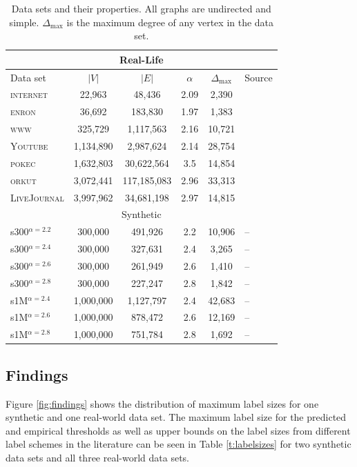 \begin{table}[!ht]
\centering
\small
\begin{tabular}{lccccl}\hline
\multicolumn{6}{c}{Real-Life}\\\hline
Data set  & $\vert V \vert$ & $\vert E\vert$ & $\alpha$  & $\Delta_{\max}$ & Source\\\hline
\textsc{internet} &  22,963        &    48,436      & 2.09     & 2,390        & \cite{newman}\\
\textsc{enron}    &  36,692        &   183,830      & 1.97    &1,383         & \cite{leskovec2009community}\\
\textsc{www}      & 325,729        & 1,117,563     & 2.16 & 10,721            & \cite{albert1999internet}\\
\textsc{Youtube} & 1,134,890 & 2,987,624 & 2.14 & 28,754 & \cite{?}\\
\textsc{pokec} & 1,632,803 & 30,622,564 & 3.5 & 14,854 & \cite{takac2012data}\\
\textsc{orkut} & 3,072,441 & 117,185,083 & 2.96 & 33,313 & \cite{yang2015defining}\\
\textsc{LiveJournal} &  3,997,962        &    34,681,198      & 2.97     & 14,815        & \cite{?}\\\hline


\multicolumn{6}{c}{Synthetic}\\\hline
s300$^{\alpha=2.2}$    & 300,000        & 491,926        & 2.2    & 10,906 & --\\
s300$^{\alpha=2.4}$    & 300,000        & 327,631        & 2.4    & 3,265 & --\\
s300$^{\alpha=2.6}$    & 300,000        & 261,949        & 2.6    & 1,410 & --\\
s300$^{\alpha=2.8}$    & 300,000        & 227,247        & 2.8    & 1,842 & --\\
s1M$^{\alpha=2.4}$    & 1,000,000       & 1,127,797      & 2.4    & 42,683 &-- \\
s1M$^{\alpha=2.6}$    & 1,000,000       & 878,472        & 2.6    & 12,169 &-- \\
s1M$^{\alpha=2.8}$    & 1,000,000       & 751,784         & 2.8   & 1,692  &-- \\\hline
\end{tabular}
\caption{Data sets and their properties. All graphs are undirected and simple. $\Delta_{\max}$ is the maximum degree of any vertex in the data set.}
\label{t:datasets}
\end{table}


\subsection{Findings}
Figure \ref{fig:findings} shows the distribution of maximum label sizes for one synthetic and one real-world data set. The maximum label size
for the predicted and empirical thresholds as well as upper bounds on the label sizes from different label schemes in the literature can be seen in Table \ref{t:labelsizes} for two synthetic
data sets and all three real-world data sets. 

